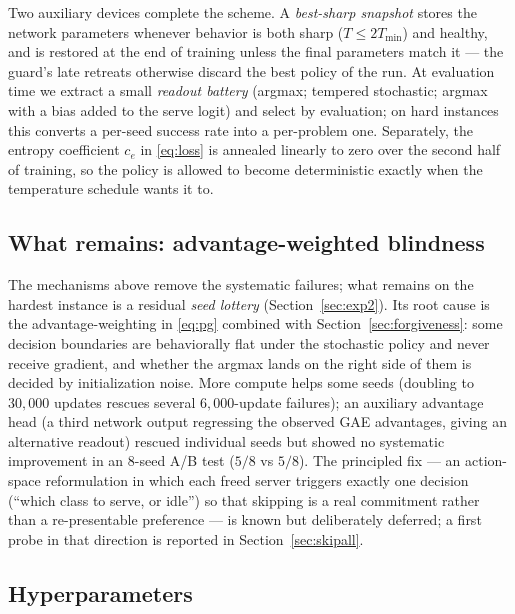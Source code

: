 \documentclass[11pt,a4paper]{article}
\begin{document}
Two auxiliary devices complete the scheme.  A \emph{best-sharp snapshot}
stores the network parameters whenever behavior is both sharp
($T \le 2T_{\min}$) and healthy, and is restored at the end of training
unless the final parameters match it --- the guard's late retreats
otherwise discard the best policy of the run.  At evaluation time we
extract a small \emph{readout battery} (argmax; tempered stochastic;
argmax with a bias added to the serve logit) and select by evaluation;
on hard instances this converts a per-seed success rate into a
per-problem one.  Separately, the entropy coefficient $c_e$ in
\eqref{eq:loss} is annealed linearly to zero over the second half of
training, so the policy is allowed to become deterministic exactly when
the temperature schedule wants it to.

\subsection{What remains: advantage-weighted blindness}
\label{sec:blindness}

The mechanisms above remove the systematic failures; what remains on the
hardest instance is a residual \emph{seed lottery}
(Section~\ref{sec:exp2}).  Its root cause is the advantage-weighting in
\eqref{eq:pg} combined with Section~\ref{sec:forgiveness}: some
decision boundaries are behaviorally flat under the stochastic policy
and never receive gradient, and whether the argmax lands on the right
side of them is decided by initialization noise.  More compute helps
some seeds (doubling to $30{,}000$ updates rescues several
$6{,}000$-update failures); an auxiliary advantage head (a third network
output regressing the observed GAE advantages, giving an alternative
readout) rescued individual seeds but showed no systematic improvement
in an 8-seed A/B test ($5/8$ vs $5/8$).  The principled fix --- an
action-space reformulation in which each freed server triggers exactly
one decision (``which class to serve, or idle'') so that skipping is a
real commitment rather than a re-presentable preference --- is known but
deliberately deferred; a first probe in that direction is reported in
Section~\ref{sec:skipall}.

\subsection{Hyperparameters}
\end{document}
